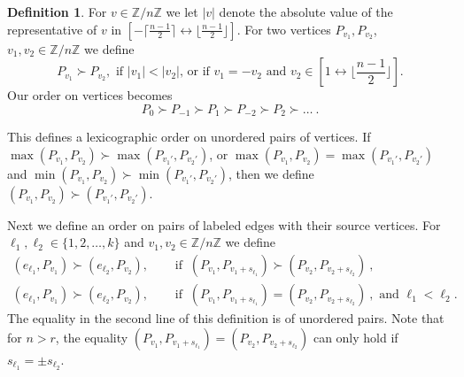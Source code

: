 \documentclass{amsproc}
\theoremstyle{definition}
\newtheorem{definition}[theorem]{Definition}
\theoremstyle{remark}
\numberwithin{equation}{section}
\newcommand{\Z}{{\mathbb Z}}
\newcommand{\interval}{\longleftrightarrow}
\begin{document}
\begin{definition}\label{graph_order_def}
For $v\in \Z/n\Z$ we let $|v|$ denote the absolute value of the representative of $v$ 
in $[-\lceil \frac{n-1}{2} \rceil\interval \lfloor \frac{n-1}{2} \rfloor]$. For two vertices $P_{v_1}, P_{v_2}$, $v_1,v_2\in \Z/n\Z$ we define
\[
P_{v_1}\succ P_{v_2}, \text{ if $|v_1|<|v_2|$, or if $v_1=-v_2$ and $v_2\in[1\interval \lfloor \frac{n-1}{2} \rfloor]$.}
\]
Our order on vertices becomes
\begin{equation}\label{vertex_order}
P_0\succ P_{-1}\succ P_1\succ P_{-2}\succ P_2\succ\dots\ .
\end{equation}

This defines a lexicographic order on unordered pairs of vertices. If $\max(P_{v_1},P_{v_2})\succ \max(P_{v_1'},P_{v_2'})$, or $\max(P_{v_1},P_{v_2})= \max(P_{v_1'},P_{v_2'})$ and $\min(P_{v_1},P_{v_2})\succ \min(P_{v_1'},P_{v_2'})$, then we define $(P_{v_1},P_{v_2})\succ (P_{v_1'},P_{v_2'})$.

Next we define an order on pairs of labeled edges with their source vertices. For $\ell_1,\ell_2\in\{1,2,\dots,k\}$ and $v_1,v_2\in \Z/n\Z$ we define
\begin{equation}\label{edge_order}
\begin{split}
(e_{\ell_1},P_{v_1})\succ (e_{\ell_2},P_{v_2}),\quad &\text{ if }\ (P_{v_1}, P_{v_1+s_{\ell_1}})\succ (P_{v_2}, P_{v_2+s_{\ell_2}})\ ,\\
(e_{\ell_1},P_{v_1})\succ (e_{\ell_2},P_{v_2}),\quad  &\text{ if }\  (P_{v_1}, P_{v_1+s_{\ell_1}})= (P_{v_2}, P_{v_2+s_{\ell_2}})\ , \text{ and } \ell_1<\ell_2.
\end{split}
\end{equation}
The equality in the second line of this definition is of unordered pairs. Note that for $n>r$, the equality $(P_{v_1}, P_{v_1+s_{\ell_1}})= (P_{v_2}, P_{v_2+s_{\ell_2}})$ can only hold if $s_{\ell_1}= \pm s_{\ell_2}$.




\end{definition}
\end{document}
